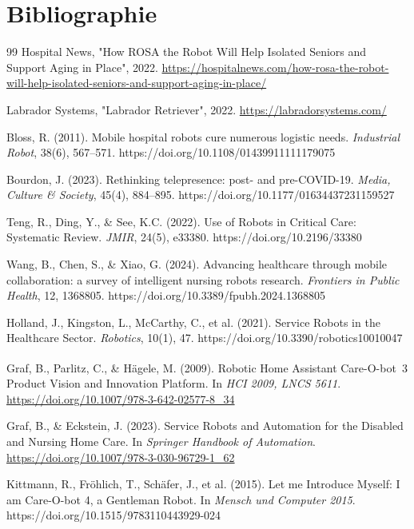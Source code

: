 \documentclass[12pt,a4paper]{article}
\begin{document}
\section*{Bibliographie}
\begin{thebibliography}{99}
Hospital News, "How ROSA the Robot Will Help Isolated Seniors and Support Aging in Place", 2022. 
\url{https://hospitalnews.com/how-rosa-the-robot-will-help-isolated-seniors-and-support-aging-in-place/}

Labrador Systems, "Labrador Retriever", 2022.  \url{https://labradorsystems.com/}

Bloss, R. (2011). Mobile hospital robots cure numerous logistic needs. \textit{Industrial Robot}, 38(6), 567--571. https://doi.org/10.1108/01439911111179075

Bourdon, J. (2023). Rethinking telepresence: post- and pre-COVID-19. \textit{Media, Culture \& Society}, 45(4), 884--895. https://doi.org/10.1177/01634437231159527

Teng, R., Ding, Y., \& See, K.C. (2022). Use of Robots in Critical Care: Systematic Review. \textit{JMIR}, 24(5), e33380. https://doi.org/10.2196/33380

Wang, B., Chen, S., \& Xiao, G. (2024). Advancing healthcare through mobile collaboration: a survey of intelligent nursing robots research. \textit{Frontiers in Public Health}, 12, 1368805. https://doi.org/10.3389/fpubh.2024.1368805

Holland, J., Kingston, L., McCarthy, C., et al. (2021). Service Robots in the Healthcare Sector. \textit{Robotics}, 10(1), 47. https://doi.org/10.3390/robotics10010047

Graf, B., Parlitz, C., \& H\"agele, M. (2009). Robotic Home Assistant Care-O-bot\textsuperscript{\textregistered}~3 Product Vision and Innovation Platform. In \textit{HCI 2009, LNCS 5611}. \url{https://doi.org/10.1007/978-3-642-02577-8_34}

Graf, B., \& Eckstein, J. (2023). Service Robots and Automation for the Disabled and Nursing Home Care. In \textit{Springer Handbook of Automation}. \url{https://doi.org/10.1007/978-3-030-96729-1_62}

Kittmann, R., Fröhlich, T., Schäfer, J., et al. (2015). Let me Introduce Myself: I am Care-O-bot 4, a Gentleman Robot. In \textit{Mensch und Computer 2015}. https://doi.org/10.1515/9783110443929-024


\end{thebibliography}
\end{document}
